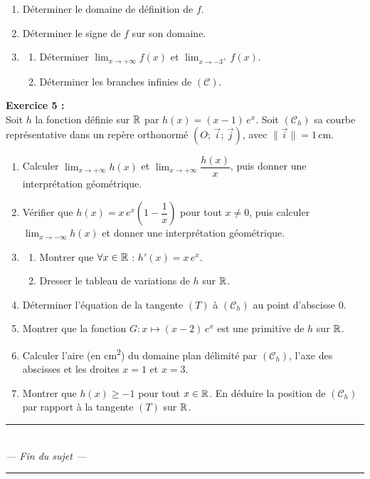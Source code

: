 \begin{enumerate}[leftmargin=1.5em, label=\textbf{\arabic*.}, itemsep=2pt, topsep=4pt]
  \item D\'{e}terminer le domaine de d\'{e}finition de $f$.
  \item D\'{e}terminer le signe de $f$ sur son domaine.
  \item
    \begin{enumerate}[label=\textbf{\alph*.}, itemsep=1pt, topsep=1pt]
      \item D\'{e}terminer $\displaystyle\lim_{x \to +\infty} f(x)$
            et $\displaystyle\lim_{x \to -3^{+}} f(x)$.
      \item D\'{e}terminer les branches infinies de $(\mathcal{C})$.
    \end{enumerate}
\end{enumerate}

\newpage

\noindent\textbf{Exercice 5 :}\\
Soit $h$ la fonction d\'{e}finie sur $\mathbb{R}$ par $h(x) = (x-1)\,e^{x}$.
Soit $(\mathcal{C}_h)$ sa courbe repr\'{e}sentative dans un rep\`{e}re
orthonorm\'{e} $(O;\,\vec{i};\,\vec{j})$, avec $\|\vec{i}\| = 1\,\text{cm}$.

\begin{enumerate}[leftmargin=1.5em, label=\textbf{\arabic*.}, itemsep=2pt, topsep=4pt]
  \item Calculer $\displaystyle\lim_{x \to +\infty} h(x)$ et
        $\displaystyle\lim_{x \to +\infty} \dfrac{h(x)}{x}$,
        puis donner une interpr\'{e}tation g\'{e}om\'{e}trique.
  \item V\'{e}rifier que $h(x) = x\,e^{x}\!\left(1 - \dfrac{1}{x}\right)$
        pour tout $x \neq 0$, puis calculer $\displaystyle\lim_{x \to -\infty} h(x)$
        et donner une interpr\'{e}tation g\'{e}om\'{e}trique.
  \item
    \begin{enumerate}[label=\textbf{\alph*.}, itemsep=1pt, topsep=1pt]
      \item Montrer que $\forall x \in \mathbb{R}$ :
            $h'(x) = x\,e^{x}$.
      \item Dresser le tableau de variations de $h$ sur $\mathbb{R}$.
    \end{enumerate}
  \item D\'{e}terminer l'\'{e}quation de la tangente $(T)$ \`{a}
        $(\mathcal{C}_h)$ au point d'abscisse $0$.
  \item Montrer que la fonction $G : x \mapsto (x-2)\,e^{x}$
        est une primitive de $h$ sur $\mathbb{R}$.
  \item Calculer l'aire (en cm\textsuperscript{2}) du domaine plan d\'{e}limit\'{e}
        par $(\mathcal{C}_h)$, l'axe des abscisses et les droites
        $x = 1$ et $x = 3$.
  \item Montrer que $h(x) \geq -1$ pour tout $x \in \mathbb{R}$.
        En d\'{e}duire la position de $(\mathcal{C}_h)$ par rapport
        \`{a} la tangente $(T)$ sur $\mathbb{R}$.
\end{enumerate}

\begin{center}
  \color{charcoal}\rule{5cm}{0.4pt}\\[3pt]
  \textit{--- Fin du sujet ---}\\
  \rule{5cm}{0.4pt}
\end{center}
